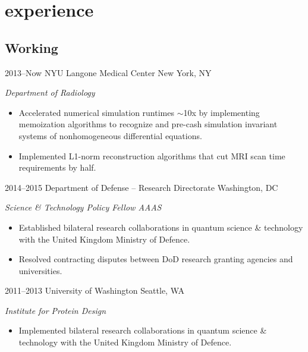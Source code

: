 \documentclass[]{friggeri-cv} %
\begin{document}

\section{experience}

\subsection{Working}

\begin{entrylist}


\entry
{2013--Now}
{NYU Langone Medical Center}
{New York, NY}
{\emph{Department of Radiology}
\begin{itemize}
\item Accelerated numerical simulation runtimes $\sim$10x  by implementing memoization algorithms to recognize and pre-cash simulation invariant systems of nonhomogeneous differential equations.
\item Implemented L1-norm reconstruction algorithms that cut MRI scan time requirements by half.      
\end{itemize}}

\entry
{2014--2015}
{Department of Defense -- Research Directorate}
{Washington, DC}
{\emph{Science \& Technology Policy Fellow AAAS}
\begin{itemize}
\item Established bilateral research collaborations in quantum science \& technology with the United Kingdom Ministry of Defence. 
\item Resolved contracting disputes between DoD research granting agencies and universities.       
\end{itemize}}

\entry
{2011--2013}
{University of Washington}
{Seattle, WA}
{\emph{Institute for Protein Design}
\begin{itemize}
\item Implemented bilateral research collaborations in quantum science \& technology with the United Kingdom Ministry of Defence. 
\end{itemize}}


\end{entrylist}
\end{document}
